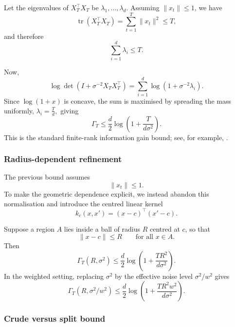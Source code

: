 Let the eigenvalues of $X_T^\top X_T$ be $\lambda_1,\dots,\lambda_d$.
Assuming $\|x_t\|\leq 1$, we have
$$
\operatorname{tr}(X_T^\top X_T)
=
\sum_{t=1}^T
\|x_t\|^2
\leq
T,
$$
and therefore
$$
\sum_{i=1}^d \lambda_i \leq T.
$$

Now,
\begin{equation*}
\log\det
\left(
I+\sigma^{-2}X_TX_T^\top
\right)
=
\sum_{i=1}^d
\log(1+\sigma^{-2}\lambda_i).
\end{equation*}
Since $\log(1+x)$ is concave, the sum is maximised by spreading the mass uniformly,
$
\lambda_i
=
\frac{T}{d},$
giving
\begin{equation*}
\Gamma_T
\leq
\frac{d}{2}
\log
\left(
1+\frac{T}{d\sigma^2}
\right).
\end{equation*}
This is the standard finite-rank information gain bound; see, for example, \cite{Srinivas2009}.

\subsubsection{Radius-dependent refinement}

The previous bound assumes
\begin{equation*}
\|x_t\|\leq 1.
\end{equation*}
To make the geometric dependence explicit, we instead abandon this normalisation and introduce the centred linear kernel
\begin{equation*}
k_c(x,x')
=
(x-c)^\top(x'-c).
\end{equation*}

\begin{proposition}
Suppose a region $A$ lies inside a ball of radius $R$ centred at $c$, so that
\begin{equation*}
\|x-c\|\leq R
\qquad
\text{for all } x\in A.
\end{equation*}
Then
\begin{equation*}
\Gamma_T(R,\sigma^2)
\leq
\frac{d}{2}
\log
\left(
1+\frac{TR^2}{d\sigma^2}
\right).
\end{equation*}
In the weighted setting, replacing $\sigma^2$ by the effective noise level $\sigma^2/w^2$
gives
\begin{equation*}
\Gamma_T(R,\sigma^2/w^2)
\leq
\frac{d}{2}
\log
\left(
1+\frac{TR^2w^2}{d\sigma^2}
\right).
\end{equation*}
\end{proposition}

\subsubsection{Crude versus split bound}

